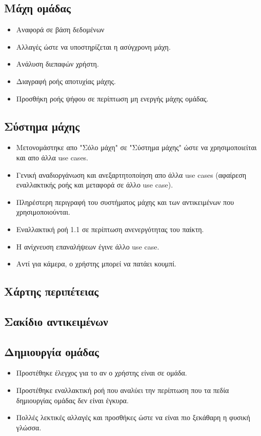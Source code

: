 \subsection{Μάχη ομάδας}
\begin{itemize}
    \item Αναφορά σε βάση δεδομένων
    \item Αλλαγές ώστε να υποστηρίζεται η ασύγχρονη μάχη.
    \item Ανάλυση διεπαφών χρήστη.
    \item Διαγραφή ροής αποτυχίας μάχης.
    \item Προσθήκη ροής ψήφου σε περίπτωση μη ενεργής μάχης ομάδας.
\end{itemize}
\subsection{Σύστημα μάχης}
\begin{itemize}
    \item Μετονομάστηκε απο "Σόλο μάχη" σε "Σύστημα μάχης" ώστε να χρησιμοποιείται και απο άλλα use cases.
    \item Γενική αναδιοργάνωση και ανεξαρτητοποίηση απο άλλα use cases (αφαίρεση εναλλακτικής ροής και μεταφορά σε άλλο use case).
    \item Πληρέστερη περιγραφή του συστήματος μάχης και των αντικειμένων που χρησιμοποιούνται.
    \item Εναλλακτική ροή 1.1 σε περίπτωση ανενεργότητας του παίκτη.
	\item Η ανίχνευση επαναλήψεων έγινε άλλο use case.
	\item Αντί για κάμερα, ο χρήστης μπορεί να πατάει κουμπί.
\end{itemize}
\subsection{Χάρτης περιπέτειας}
\subsection{Σακίδιο αντικειμένων}
\subsection{Δημιουργία ομάδας}
\begin{itemize}
    \item Προστέθηκε έλεγχος για το αν ο χρήστης είναι σε ομάδα.
    \item Προστέθηκε εναλλακτική ροή που αναλύει την περίπτωση που τα πεδία δημιουργίας ομάδας δεν είναι έγκυρα.
    \item Πολλές λεκτικές αλλαγές και προσθήκες ώστε να είναι πιο ξεκάθαρη η φυσική γλώσσα.
\end{itemize}
